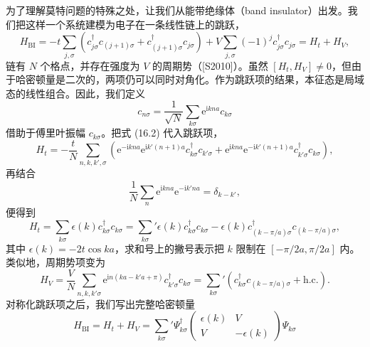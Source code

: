 为了理解莫特问题的特殊之处，让我们从能带绝缘体（band insulator）出发。我们把这样一个系统建模为电子在一条线性链上的跳跃，
\begin{equation*}
H_{\mathrm{BI}}=-t\sum_{j,\sigma}\left(c^{\dagger}_{j\sigma}c_{(j+1)\sigma}+c^{\dagger}_{(j+1)\sigma}c_{j\sigma}\right)+V\sum_{j,\sigma}(-1)^{j}c^{\dagger}_{j\sigma}c_{j\sigma}=H_{t}+H_{V},\tag{16.1}
\end{equation*}
链有 $N$ 个格点，并存在强度为 $V$ 的周期势（[S2010]）。虽然 $[H_{t},H_{V}]\neq 0$，但由于哈密顿量是二次的，两项仍可以同时对角化。作为跳跃项的结果，本征态是局域态的线性组合。因此，我们定义
\begin{equation*}
c_{n\sigma}=\frac{1}{\sqrt{N}}\sum_{k\sigma}\mathrm{e}^{\mathrm{i}kna}c_{k\sigma}\tag{16.2}
\end{equation*}
借助于傅里叶振幅 $c_{k\sigma}$。把式 (16.2) 代入跳跃项，
\begin{equation*}
H_{t}=-\frac{t}{N}\sum_{n,k,k',\sigma}\left(\mathrm{e}^{-\mathrm{i}kna}\mathrm{e}^{\mathrm{i}k'(n+1)a}c^{\dagger}_{k\sigma}c_{k'\sigma}+\mathrm{e}^{\mathrm{i}kna}\mathrm{e}^{-\mathrm{i}k'(n+1)a}c^{\dagger}_{k'\sigma}c_{k\sigma}\right),\tag{16.3}
\end{equation*}
再结合
\begin{equation*}
\frac{1}{N}\sum_{n}\mathrm{e}^{\mathrm{i}kna}\mathrm{e}^{-\mathrm{i}k'na}=\delta_{k-k'},\tag{16.4}
\end{equation*}
便得到
\begin{equation*}
H_{t}=\sum_{k\sigma}\epsilon(k)c^{\dagger}_{k\sigma}c_{k\sigma}={\sum_{k\sigma}}'\epsilon(k)c^{\dagger}_{k\sigma}c_{k\sigma}-\epsilon(k)c^{\dagger}_{(k-\pi/a)\sigma}c_{(k-\pi/a)\sigma},\tag{16.5}
\end{equation*}
其中 $\epsilon(k)=-2t\cos ka$，求和号上的撇号表示把 $k$ 限制在 $[-\pi/2a,\pi/2a]$ 内。类似地，周期势项变为
\begin{equation*}
H_{V}=\frac{V}{N}\sum_{n,k,k'\sigma}\mathrm{e}^{\mathrm{i}n(ka-k'a+\pi)}c^{\dagger}_{k'\sigma}c_{k\sigma}={\sum_{k\sigma}}'\left(c^{\dagger}_{k\sigma}c_{(k-\pi/a)\sigma}+\mathrm{h.c.}\right).\tag{16.6}
\end{equation*}
对称化跳跃项之后，我们写出完整哈密顿量
\begin{equation*}
H_{\mathrm{BI}}=H_{t}+H_{V}={\sum_{k\sigma}}'\Psi^{\dagger}_{k\sigma}\begin{pmatrix}\epsilon(k) & V\\ V & -\epsilon(k)\end{pmatrix}\Psi_{k\sigma}\tag{16.7}
\end{equation*}

